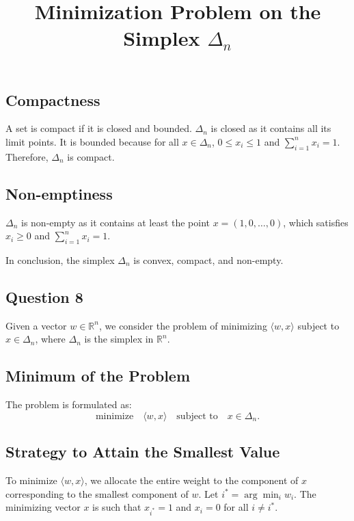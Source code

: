\documentclass[12p]{article}
\begin{document}
\subsection*{Compactness}
A set is compact if it is closed and bounded. \(\Delta_n\) is closed as it contains all its limit points. It is bounded because for all \( x \in \Delta_n \), \( 0 \leq x_i \leq 1 \) and \( \sum_{i=1}^n x_i = 1 \). Therefore, \(\Delta_n\) is compact.

\subsection*{Non-emptiness}
\(\Delta_n\) is non-empty as it contains at least the point \( x = (1, 0, \ldots, 0) \), which satisfies \( x_i \geq 0 \) and \( \sum_{i=1}^n x_i = 1 \).

In conclusion, the simplex \( \Delta_n \) is convex, compact, and non-empty.

\subsection*{Question 8} 

\title{Minimization Problem on the Simplex \( \Delta_n \)}
\maketitle

Given a vector \( w \in \mathbb{R}^n \), we consider the problem of minimizing \( \langle w, x \rangle \) subject to \( x \in \Delta_n \), where \( \Delta_n \) is the simplex in \( \mathbb{R}^n \).

\subsection*{Minimum of the Problem}
The problem is formulated as:
\[ \text{minimize} \quad \langle w, x \rangle \quad \text{subject to} \quad x \in \Delta_n. \]

\subsection*{Strategy to Attain the Smallest Value}
To minimize \( \langle w, x \rangle \), we allocate the entire weight to the component of \( x \) corresponding to the smallest component of \( w \). Let \( i^* = \arg \min_i w_i \). The minimizing vector \( x \) is such that \( x_{i^*} = 1 \) and \( x_i = 0 \) for all \( i \neq i^* \).
\end{document}
